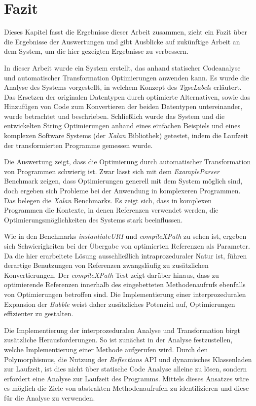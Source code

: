 \chapter{Fazit}

Dieses Kapitel fasst die Ergebnisse dieser Arbeit zusammen, zieht ein Fazit über
die Ergebnisse der Auswertungen und gibt Ausblicke auf zukünftige Arbeit an dem System, 
um die hier gezeigten Ergebnisse zu verbessern. 

In dieser Arbeit wurde ein System erstellt, das anhand statischer Codeanalyse und
automatischer Transformation Optimierungen anwenden kann. Es wurde die Analyse des
Systems vorgestellt, in welchem Konzept des \textit{TypeLabel}s erläutert. Das Ersetzen der 
originalen Datentypen durch optimierte Alternativen, sowie das Hinzufügen von Code
zum Konvertieren der beiden Datentypen untereinander, wurde betrachtet und beschrieben.
Schließlich wurde das System und die entwickelten String Optimierungen anhand eines 
einfachen Beispiels und eines komplexen Software Systems (der \textit{Xalan} Bibliothek)
getestet, indem die Laufzeit der transformierten Programme gemessen wurde. 

Die Auswertung zeigt, dass die Optimierung durch automatischer Transformation von Programmen
schwierig ist. Zwar lässt sich mit dem \textit{ExampleParser} Benchmark zeigen,
dass Optimierungen generell mit dem System möglich sind, doch ergeben sich Probleme
bei der Anwendung in komplexeren Programmen. Das belegen die \textit{Xalan} Benchmarks. 
Es zeigt sich, dass in komplexen Programmen die Kontexte, in denen Referenzen verwendet
werden, die Optimierungsmöglichkeiten des Systems stark beeinflussen. 

Wie in den Benchmarks \textit{instantiateURI} und \textit{compileXPath} zu sehen ist,
ergeben sich Schwierigkeiten bei der Übergabe von optimierten Referenzen als Parameter. 
Da die hier erarbeitete Lösung ausschließlich intraprozeduraler
Natur ist, führen derartige Benutzungen von Referenzen zwangsläufig zu zusätzlichen 
Konvertierungen. Der \textit{compileXPath} Test zeigt darüber hinaus, dass zu
optimierende Referenzen innerhalb des eingebetteten Methodenaufrufs ebenfalls von 
Optimierungen betroffen sind. Die Implementierung einer interprozeduralen Expansion
der \textit{Bubble} weist daher zusätzliches Potenzial auf, Optimierungen effizienter zu gestalten.

Die Implementierung der interprozeduralen Analyse und Transformation birgt zusätzliche
Herausforderungen. So ist zunächst in der Analyse festzustellen, welche Implementierung einer 
Methode aufgerufen wird. Durch den Polymorphismus, die Nutzung der \textit{Reflections} API und
dynamisches Klassenladen zur Laufzeit, ist dies nicht über statische Code Analyse alleine zu 
lösen, sondern erfordert eine Analyse zur Laufzeit des Programms. Mittels dieses Ansatzes wäre 
es möglich die Ziele von abstrakten Methodenaufrufen zu identifizieren und diese für die 
Analyse zu verwenden. 

